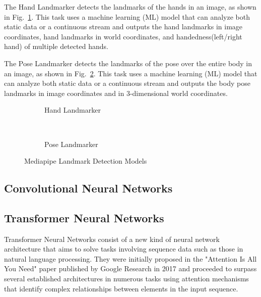 The Hand Landmarker detects the landmarks of the hands in an image, as shown in Fig.~\ref{fig:mediapipe_hand_landmarks}. This task uses a machine learning (ML) model that can analyze both static data or a continuous stream and outputs the hand landmarks in image coordinates, hand landmarks in world coordinates, and handedness(left/right hand) of multiple detected hands.

The Pose Landmarker detects the landmarks of the pose over the entire body in an image, as shown in Fig.~\ref{fig:mediapipe_pose_landmarks}.  This task uses a machine learning (ML) model that can analyze both static data or a continuous stream and outputs the body pose landmarks in image coordinates and in 3-dimensional world coordinates.
\fi

\begin{figure}[H]
    \centering
    \begin{subfigure}[b]{0.49\textwidth}
        \caption[Hand Landmarker]{Hand Landmarker}
        \label{fig:mediapipe_hand_landmarks}
    \end{subfigure} \
    \begin{subfigure}[b]{0.49\textwidth}
        \caption[Pose Landmarker]{Pose Landmarker}
        \label{fig:mediapipe_pose_landmarks}
    \end{subfigure}
    \caption[Mediapipe Landmark Detection Models]{Mediapipe Landmark Detection Models}
    \label{fig:mediapipe_landmarks}
\end{figure}


\subsection{Convolutional Neural Networks}

\subsection{Transformer Neural Networks}
\label{subsection:transformer_neural_networks}

Transformer Neural Networks consist of a new kind of neural network architecture that aims to solve tasks involving sequence data such as those in natural language processing. They were initially proposed in the "Attention Is All You Need" paper published by Google Research in 2017\cite{Vaswani2017} and proceeded to surpass several established architectures in numerous tasks using attention mechanisms that identify complex relationships between elements in the input sequence.


